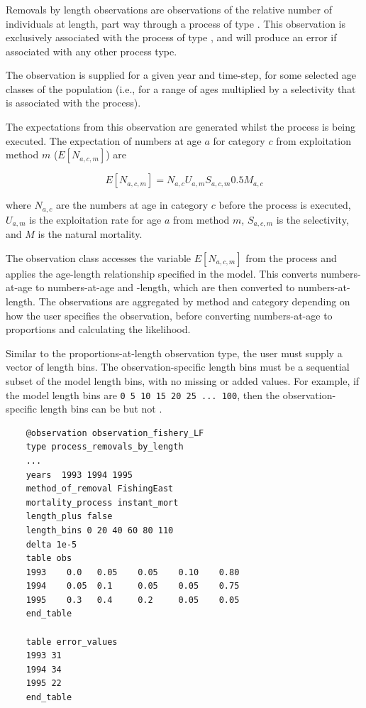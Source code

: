 \subsubsection{ \label{sec:removals-by-length} \label{sec:Observation-ProcessRemovalsByLength}}

Removals by length observations are observations of the relative number of individuals at length, part way through a process of type . This observation is exclusively associated with the process of type , and will produce an error if associated with any other process type.

The observation is supplied for a given year and time-step, for some selected age classes of the population (i.e., for a range of ages multiplied by a selectivity that is associated with the process).

The expectations from this observation are generated whilst the process is being executed. The expectation of numbers at age $a$ for category $c$ from exploitation method $m$ ($E[N_{a,c,m}]$) are

\begin{equation}
	E[N_{a,c,m}] = N_{a,c} U_{a,m} S_{a,c,m} 0.5 M_{a,c}
\end{equation}

where $N_{a,c}$ are the numbers at age in category $c$ before the process is executed, $U_{a,m}$ is the exploitation rate for age $a$ from method $m$, $S_{a,c,m}$ is the selectivity, and $M$ is the natural mortality.

The observation class accesses the variable $E[N_{a,c,m}]$ from the process and applies the age-length relationship specified in the model. This converts numbers-at-age to numbers-at-age and -length, which are then converted to numbers-at-length. The observations are aggregated by method and category depending on how the user specifies the observation, before converting numbers-at-age to proportions and calculating the likelihood.

Similar to the proportions-at-length observation type, the user must supply a vector of length bins. The observation-specific length bins must be a sequential subset of the model length bins, with no missing or added values. For example, if the model length bins are \texttt{0 5 10 15 20 25 ... 100}, then the observation-specific length bins can be  but not .

{\small{\begin{verbatim}
	@observation observation_fishery_LF
	type process_removals_by_length
	...
	years  1993 1994 1995
	method_of_removal FishingEast
	mortality_process instant_mort
	length_plus false
	length_bins 0 20 40 60 80 110
	delta 1e-5
	table obs
	1993    0.0   0.05    0.05    0.10    0.80
	1994    0.05  0.1     0.05    0.05    0.75
	1995    0.3   0.4     0.2     0.05    0.05
	end_table
	
	table error_values
	1993 31
	1994 34
	1995 22
	end_table
\end{verbatim}}}

